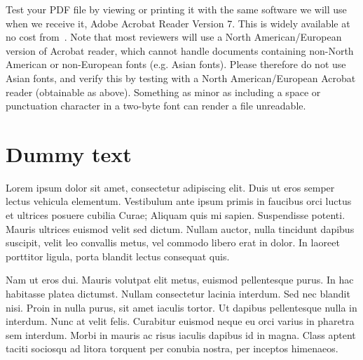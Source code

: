 \documentclass{sigchi-ext}
\newcommand\tabhead[1]{\textbf{#1}}
\begin{document}
Test your PDF file by viewing or printing it with the same software we will use when we receive it, Adobe Acrobat Reader Version 7. 
This is widely available at no cost from~\cite{Acrobat7}.  
Note that most reviewers will use a North American/European version of Acrobat reader, which cannot handle documents containing non-North American or non-European fonts (e.g. Asian fonts).  
Please therefore do not use Asian fonts, and verify this by testing with a North American/European Acrobat reader (obtainable as above). Something as minor as including a space or punctuation character in a two-byte font can render a file unreadable.


\section{Dummy text}
Lorem ipsum dolor sit amet, consectetur adipiscing elit. 
Duis ut eros semper lectus vehicula elementum. 
Vestibulum ante ipsum primis in faucibus orci luctus et ultrices posuere cubilia Curae; 
Aliquam quis mi sapien. Suspendisse potenti. Mauris ultrices euismod velit sed dictum. Nullam auctor, nulla tincidunt dapibus suscipit, velit leo convallis metus, vel commodo libero erat in dolor. In laoreet porttitor ligula, porta blandit lectus consequat quis. 

Nam ut eros dui. Mauris volutpat elit metus, euismod pellentesque purus. In hac habitasse platea dictumst. Nullam consectetur lacinia interdum. Sed nec blandit nisi. Proin in nulla purus, sit amet iaculis tortor. Ut dapibus pellentesque nulla in interdum. Nunc at velit felis. Curabitur euismod neque eu orci varius in pharetra sem interdum. Morbi in mauris ac risus iaculis dapibus id in magna. Class aptent taciti sociosqu ad litora torquent per conubia nostra, per inceptos himenaeos.
\end{document}
